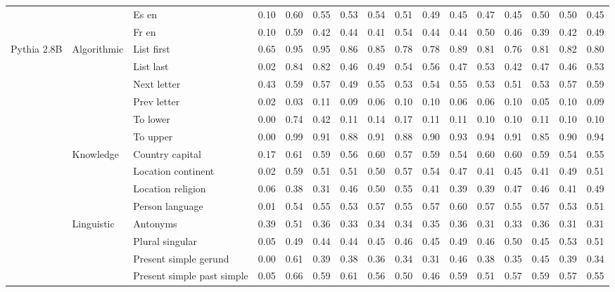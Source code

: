 \begin{center}
\begin{longtable}{lllrrrrrrrrrrrrr}
 &  & Es en & 0.10 & 0.60 & 0.55 & 0.53 & 0.54 & 0.51 & 0.49 & 0.45 & 0.47 & 0.45 & 0.50 & 0.50 & 0.45 \\
 &  & Fr en & 0.10 & 0.59 & 0.42 & 0.44 & 0.41 & 0.54 & 0.44 & 0.44 & 0.50 & 0.46 & 0.39 & 0.42 & 0.49 \\
\cline{1-16} \cline{2-16}
\multirow[t]{18}{*}{Pythia 2.8B} & \multirow[t]{6}{*}{Algorithmic} & List first & 0.65 & 0.95 & 0.95 & 0.86 & 0.85 & 0.78 & 0.78 & 0.89 & 0.81 & 0.76 & 0.81 & 0.82 & 0.80 \\
 &  & List last & 0.02 & 0.84 & 0.82 & 0.46 & 0.49 & 0.54 & 0.56 & 0.47 & 0.53 & 0.42 & 0.47 & 0.46 & 0.53 \\
 &  & Next letter & 0.43 & 0.59 & 0.57 & 0.49 & 0.55 & 0.53 & 0.54 & 0.55 & 0.53 & 0.51 & 0.53 & 0.57 & 0.59 \\
 &  & Prev letter & 0.02 & 0.03 & 0.11 & 0.09 & 0.06 & 0.10 & 0.10 & 0.06 & 0.06 & 0.10 & 0.05 & 0.10 & 0.09 \\
 &  & To lower & 0.00 & 0.74 & 0.42 & 0.11 & 0.14 & 0.17 & 0.11 & 0.11 & 0.10 & 0.10 & 0.11 & 0.10 & 0.10 \\
 &  & To upper & 0.00 & 0.99 & 0.91 & 0.88 & 0.91 & 0.88 & 0.90 & 0.93 & 0.94 & 0.91 & 0.85 & 0.90 & 0.94 \\
\cline{2-16}
 & \multirow[t]{4}{*}{Knowledge} & Country capital & 0.17 & 0.61 & 0.59 & 0.56 & 0.60 & 0.57 & 0.59 & 0.54 & 0.60 & 0.60 & 0.59 & 0.54 & 0.55 \\
 &  & Location continent & 0.02 & 0.59 & 0.51 & 0.51 & 0.50 & 0.57 & 0.54 & 0.47 & 0.41 & 0.45 & 0.41 & 0.49 & 0.51 \\
 &  & Location religion & 0.06 & 0.38 & 0.31 & 0.46 & 0.50 & 0.55 & 0.41 & 0.39 & 0.39 & 0.47 & 0.46 & 0.41 & 0.49 \\
 &  & Person language & 0.01 & 0.54 & 0.55 & 0.53 & 0.57 & 0.55 & 0.57 & 0.60 & 0.57 & 0.55 & 0.57 & 0.53 & 0.51 \\
\cline{2-16}
 & \multirow[t]{4}{*}{Linguistic} & Antonyms & 0.39 & 0.51 & 0.36 & 0.33 & 0.34 & 0.34 & 0.35 & 0.36 & 0.31 & 0.33 & 0.36 & 0.31 & 0.31 \\
 &  & Plural singular & 0.05 & 0.49 & 0.44 & 0.44 & 0.45 & 0.46 & 0.45 & 0.49 & 0.46 & 0.50 & 0.45 & 0.53 & 0.51 \\
 &  & Present simple gerund & 0.00 & 0.61 & 0.39 & 0.38 & 0.36 & 0.34 & 0.31 & 0.46 & 0.38 & 0.35 & 0.45 & 0.39 & 0.34 \\
 &  & Present simple past simple & 0.05 & 0.66 & 0.59 & 0.61 & 0.56 & 0.50 & 0.46 & 0.59 & 0.51 & 0.57 & 0.59 & 0.57 & 0.55 \\

\end{longtable}
\end{center}
